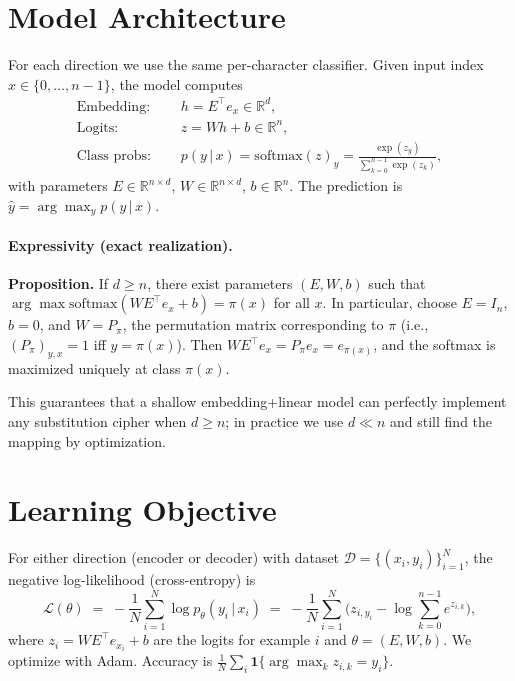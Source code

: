 \documentclass[12pt]{article}
\begin{document}
\section{Model Architecture}
For each direction we use the same per-character classifier. Given input index $x\in\{0,\dots,n-1\}$, the model computes
\begin{align}
\text{Embedding: } & \quad h = E^\top e_x \in \mathbb{R}^d, \\
\text{Logits: } & \quad z = W h + b \in \mathbb{R}^{n}, \\
\text{Class probs: } & \quad p(y\,|\,x) = \mathrm{softmax}(z)_y = \frac{\exp(z_y)}{\sum_{k=0}^{n-1}\exp(z_k)},
\end{align}
with parameters $E\in\mathbb{R}^{n\times d}$, $W\in\mathbb{R}^{n\times d}$, $b\in\mathbb{R}^{n}$. The prediction is $\hat{y}=\arg\max_y p(y\,|\,x)$.

\paragraph{Expressivity (exact realization).}
\textbf{Proposition.} If $d\ge n$, there exist parameters $(E,W,b)$ such that $\arg\max \mathrm{softmax}(W E^\top e_x + b) = \pi(x)$ for all $x$. In particular, choose $E=I_n$, $b=0$, and $W=P_\pi$, the permutation matrix corresponding to $\pi$ (i.e., $(P_\pi)_{y,x}=1$ iff $y=\pi(x)$). Then $W E^\top e_x = P_\pi e_x = e_{\pi(x)}$, and the softmax is maximized uniquely at class $\pi(x)$.

This guarantees that a shallow embedding+linear model can perfectly implement any substitution cipher when $d\!\ge\!n$; in practice we use $d\ll n$ and still find the mapping by optimization.

\section{Learning Objective}
For either direction (encoder or decoder) with dataset $\mathcal{D}=\{(x_i,y_i)\}_{i=1}^N$, the negative log-likelihood (cross-entropy) is
\begin{equation}
\mathcal{L}(\theta) \;=\; -\frac{1}{N}\sum_{i=1}^{N}\log p_\theta(y_i\,|\,x_i)
\;=\; -\frac{1}{N}\sum_{i=1}^{N}\Big(z_{i,y_i} - \log\sum_{k=0}^{n-1} e^{z_{i,k}}\Big),
\end{equation}
where $z_i=W E^\top e_{x_i}+b$ are the logits for example $i$ and $\theta=(E,W,b)$. We optimize with Adam. Accuracy is $\tfrac{1}{N}\sum_i \mathbf{1}\{\arg\max_k z_{i,k}=y_i\}$.
\end{document}
